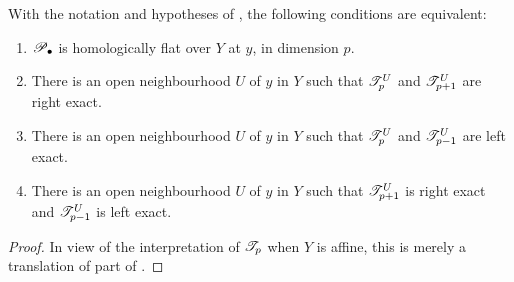 \begin{proposition}[7.8.3]
\label{III.7.8.3}
With the notation and hypotheses of , the
following conditions are equivalent:
\begin{enumerate}
  \item[\textup{a)}] $\mathscr{P}_\bullet$ is homologically flat over $Y$
  at $y$, in dimension $p$.
  \item[\textup{b)}] There is an open neighbourhood $U$ of $y$ in
  $Y$ such that $\mathscr{T}_p^U$ and $\mathscr{T}_{p+1}^U$ are right
  exact.
  \item[\textup{c)}] There is an open neighbourhood $U$ of $y$ in
  $Y$ such that $\mathscr{T}_p^U$ and $\mathscr{T}_{p-1}^U$ are left
  exact.
  \item[\textup{d)}] There is an open neighbourhood $U$ of $y$ in
  $Y$ such that $\mathscr{T}_{p+1}^U$ is right exact and
  $\mathscr{T}_{p-1}^U$ is left exact.
\end{enumerate}
\end{proposition}

\begin{proof}
In view of the interpretation of $\mathscr{T}_p$ when $Y$ is
affine, this is merely a translation of part of
.
\end{proof}

